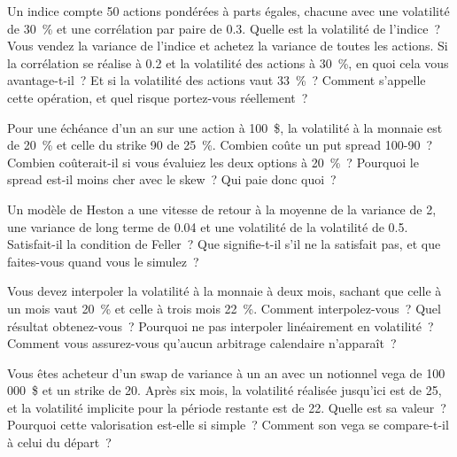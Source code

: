 \begin{question}\label{iq:iv2:vol-surface-and-vol-trading:21}
Un indice compte 50 actions pondérées à parts égales, chacune avec une volatilité de 30~\% et une corrélation par paire de 0.3. Quelle est la volatilité de l'indice~? Vous vendez la variance de l'indice et achetez la variance de toutes les actions. Si la corrélation se réalise à 0.2 et la volatilité des actions à 30~\%, en quoi cela vous avantage-t-il~? Et si la volatilité des actions vaut 33~\%~? Comment s'appelle cette opération, et quel risque portez-vous réellement~?
\end{question}

\begin{question}\label{iq:iv2:vol-surface-and-vol-trading:22}
Pour une échéance d'un an sur une action à 100~\$, la volatilité à la monnaie est de 20~\% et celle du strike 90 de 25~\%. Combien coûte un put spread 100-90~? Combien coûterait-il si vous évaluiez les deux options à 20~\%~? Pourquoi le spread est-il moins cher avec le skew~? Qui paie donc quoi~?
\end{question}

\begin{question}\label{iq:iv2:vol-surface-and-vol-trading:23}
Un modèle de Heston a une vitesse de retour à la moyenne de la variance de 2, une variance de long terme de 0.04 et une volatilité de la volatilité de 0.5. Satisfait-il la condition de Feller~? Que signifie-t-il s'il ne la satisfait pas, et que faites-vous quand vous le simulez~?
\end{question}

\begin{question}\label{iq:iv2:vol-surface-and-vol-trading:24}
Vous devez interpoler la volatilité à la monnaie à deux mois, sachant que celle à un mois vaut 20~\% et celle à trois mois 22~\%. Comment interpolez-vous~? Quel résultat obtenez-vous~? Pourquoi ne pas interpoler linéairement en volatilité~? Comment vous assurez-vous qu'aucun arbitrage calendaire n'apparaît~?
\end{question}

\begin{question}\label{iq:iv2:vol-surface-and-vol-trading:25}
Vous êtes acheteur d'un swap de variance à un an avec un notionnel vega de 100\,000~\$ et un strike de 20. Après six mois, la volatilité réalisée jusqu'ici est de 25, et la volatilité implicite pour la période restante est de 22. Quelle est sa valeur~? Pourquoi cette valorisation est-elle si simple~? Comment son vega se compare-t-il à celui du départ~?
\end{question}

